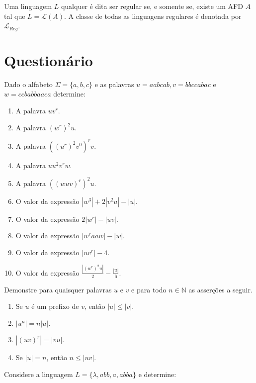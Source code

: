 \begin{definition}\label{def:LinguagensRegulares}
	Uma linguagem $L$ qualquer é dita ser regular se, e somente se, existe um AFD $A$ tal que $L = \mathcal{L}(A)$. A classe de todas as linguagens regulares é denotada por $\mathcal{L}_{Reg}$.
\end{definition}

\section{Questionário}

\begin{exercise}\label{exerc:LR1}
	Dado o alfabeto $\Sigma = \{a, b, c\}$ e as palavras $u = aabcab, v = bbccabac$ e $w = ccbabbaaca$ determine:
\end{exercise}

\begin{enumerate}
	\item A palavra $uv^r$.
	\item A palavra $(w^r)^2u$.
	\item A palavra $((u^r)^2v^0)^rv$.
	\item A palavra $uu^2v^rw$.
	\item A palavra $((wuv)^r)^2u$.
	\item O valor da expressão $|w^3| + 2|v^2u| - |u|$.
	\item O valor da expressão $2|w^r| - |uv|$.
	\item O valor da expressão $|w^raaw| - |w|$.
	\item O valor da expressão $|uv^r| - 4$.
	\item O valor da expressão $\frac{|(w^r)^2u|}{2} - \frac{|u|}{6}$.
\end{enumerate}

\begin{exercise}\label{exerc:LR2}
	Demonstre para quaisquer palavras $u$ e $v$ e para todo $n \in \mathbb{N}$ as asserções a seguir.
\end{exercise}

\begin{enumerate}
	\item Se $u$ é um prefixo de $v$, então $|u| \leq |v|$.
	\item $|u^n| = n|u|$.
	\item $|(uv)^r| = |vu|$.
	\item Se $|u| = n$, então $n \leq |uv|$.
\end{enumerate}

\begin{exercise}\label{exerc:LR3}
	Considere a linguagem $L = \{\lambda, abb, a, abba\}$ e determine:
\end{exercise}

